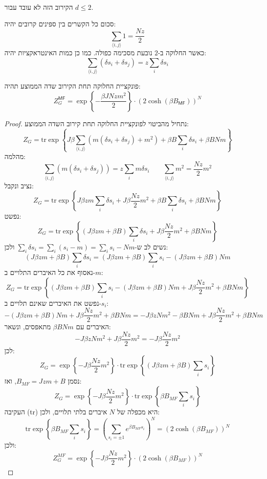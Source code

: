 \documentclass{tstextbook}
\begin{document}
\begin{remark}
הקירוב הזה לא עובד עבור \(d\leq 2\).

\end{remark}
\begin{lemma}
סכום כל הקשרים בין ספינים קרובים יהיה:
$$\sum_{\langle i,j \rangle }{1=\frac{N z}{2}}$$
כאשר החלוקה ב-\(2\) נובעת מסכימה כפולה. כמו כן כמות האינטראקציות יהיה:
$$\sum_{\langle i,j\rangle}\left(\delta s_{i}+\delta s_{j}\right)=z\sum_{i}\delta s_{i}$$

\end{lemma}
\begin{proposition}
פונקציית החלוקה תחת הקירוב שדה הממוצע תהיה:
$$Z_{G}^{\mathsf{M F}}=\exp\left\{-{\frac{\beta J N z m^{2}}{2}}\right\}\cdot(2\cosh\left(\beta B_{\mathsf{M F}}\right))^{N}$$

\end{proposition}
\begin{proof}
נתחיל מהביטוי לפונקציית החלוקה תחת קירוב השדה הממוצע:
$$Z_G = \mathrm{tr} \exp\left\{ J\beta \sum_{\langle i,j\rangle} \left( m(\delta s_i + \delta s_j) + m^2 \right) + \beta B \sum_i \delta s_i + \beta B N m \right\}
$$
מהלמה:
$$\sum_{\langle i,j\rangle} \left( m\left( \delta s_i + \delta s_j \right) \right) = z \sum_i m \delta s_i\qquad \sum_{\langle i,j\rangle} m^2 = \frac{N z}{2} m^2
$$
נציב ונקבל:
$$Z_G = \mathrm{tr} \exp\left\{ J\beta z m \sum_i \delta s_i + J\beta \frac{N z}{2} m^2 + \beta B \sum_i \delta s_i + \beta B N m \right\}
$$
נפשט:
$$Z_G = \mathrm{tr} \exp\left\{ (J\beta z m + \beta B) \sum_i \delta s_i + J\beta \frac{N z}{2} m^2 + \beta B N m \right\}$$
נשים לב ש-\(\sum_i \delta s_i = \sum_i (s_i - m) = \sum_i s_i - N m\) ולכן:
$$(J\beta z m + \beta B) \sum_i \delta s_i = (J\beta z m + \beta B) \sum_i s_i - (J\beta z m + \beta B) N m$$
נאסוף את כל האיברים התלויים ב-\(m\):
$$Z_G = \mathrm{tr} \exp\left\{ (J\beta z m + \beta B) \sum_i s_i - (J\beta z m + \beta B) N m + J\beta \frac{N z}{2} m^2 + \beta B N m \right\}$$
נפשט את האיברים שאינם תלויים ב-\(s_i\):
$$-(J\beta z m + \beta B) N m + J\beta \frac{N z}{2} m^2 + \beta B N m = -J\beta z N m^2 - \beta B N m + J\beta \frac{N z}{2} m^2 + \beta B N m
$$
האיברים עם \(\beta B N m\) מתאפסים, ונשאר:
$$-J\beta z N m^2 + J\beta \frac{N z}{2} m^2 = -J\beta \frac{N z}{2} m^2$$
לכן:
$$Z_G = \exp\left\{ -J\beta \frac{N z}{2} m^2 \right\} \cdot \mathrm{tr} \exp\left\{ (J\beta z m + \beta B) \sum_i s_i \right\}$$
נסמן \(B_{MF} = J z m + B\), ואז:
$$Z_G = \exp\left\{ -J\beta \frac{N z}{2} m^2 \right\} \cdot \mathrm{tr} \exp\left\{ \beta B_{MF} \sum_i s_i \right\}$$
העקיבה (tr) היא מכפלה של \(N\) איברים בלתי תלויים, ולכן:
$$\mathrm{tr} \exp\left\{ \beta B_{MF} \sum_i s_i \right\} = \left( \sum_{s_i = \pm 1} e^{\beta B_{MF} s_i} \right)^N = (2 \cosh(\beta B_{MF}))^N
$$
ולכן:
$$Z_G^{MF} = \exp\left\{ -J\beta \frac{N z}{2} m^2 \right\} \cdot (2 \cosh(\beta B_{MF}))^N$$

\end{proof}
\end{document}
